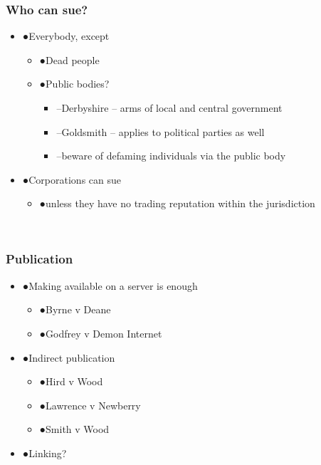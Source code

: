 \documentclass[ignorenonframetext,]{beamer}
\begin{document}
\begin{frame}
\frametitle{Who can sue?}

\begin{itemize}
\item  {●}Everybody, except

  \begin{itemize}
  \item    {●}Dead people
  \item    {●}Public bodies?

    \begin{itemize}
    \item      {--}{Derbyshire}{ -- arms of local and central government}
    \item      {--}{Goldsmith}{ -- applies to political parties as well}
    \item      {--}{beware of defaming individuals via the public body}
    \end{itemize}
  \end{itemize}
\item  {●}{Corporations can sue}

  \begin{itemize}
  \item    {●}{unless they have no trading reputation within the
    jurisdiction}
  \end{itemize}
\end{itemize}

~


\end{frame}

\begin{frame}
\frametitle{Publication}

\begin{itemize}
\item  {●}Making available on a server is enough

  \begin{itemize}
  \item    {●}Byrne v Deane
  \item    {●}Godfrey v Demon Internet
  \end{itemize}
\item  {●}Indirect publication

  \begin{itemize}
  \item    {●}Hird v Wood
  \item    {●}Lawrence v Newberry
  \item    {●}Smith v Wood
  \end{itemize}
\item  {●}Linking?
\end{itemize}

~


\end{frame}
\end{document}
